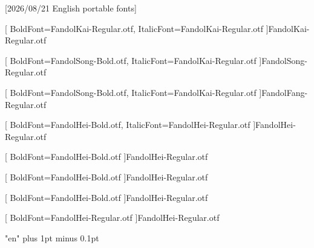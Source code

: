 [2026/08/21 English portable fonts]

\setsansfont{TeX Gyre Heros}




[
  BoldFont=FandolKai-Regular.otf,
  ItalicFont=FandolKai-Regular.otf
]{FandolKai-Regular.otf}

[
  BoldFont=FandolSong-Bold.otf,
  ItalicFont=FandolKai-Regular.otf
]{FandolSong-Regular.otf}

[
  BoldFont=FandolSong-Bold.otf,
  ItalicFont=FandolKai-Regular.otf
]{FandolFang-Regular.otf}

[
  BoldFont=FandolHei-Bold.otf,
  ItalicFont=FandolHei-Regular.otf
]{FandolHei-Regular.otf}

[
  BoldFont=FandolHei-Bold.otf
]{FandolHei-Regular.otf}

[
  BoldFont=FandolHei-Bold.otf
]{FandolHei-Regular.otf}

[
  BoldFont=FandolHei-Bold.otf
]{FandolHei-Regular.otf}

[
  BoldFont=FandolHei-Regular.otf
]{FandolHei-Regular.otf}

\XeTeXlinebreaklocale "en"
\XeTeXlinebreakskip=0pt plus 1pt minus 0.1pt

\newcommand\kaishu{\CJKfamily{kai}}
\newcommand\songti{\CJKfamily{song}}
\newcommand\heiti{\CJKfamily{hei}}
\newcommand\thmheiti{\CJKfamily{hei2}}
\newcommand\fangsong{\CJKfamily{fangsong}}
\renewcommand{\em}{\bfseries\mathversion{bold}\CJKfamily{emfont}}

